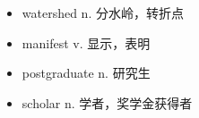 \begin{multicols}{2}
    \begin{itemize}
        \item [1.]watershed n. 分水岭，转折点
        \item [2.]manifest v. 显示，表明
        \item [3.]postgraduate n. 研究生
        \item [4.]scholar n. 学者，奖学金获得者
    \end{itemize}
\end{multicols}